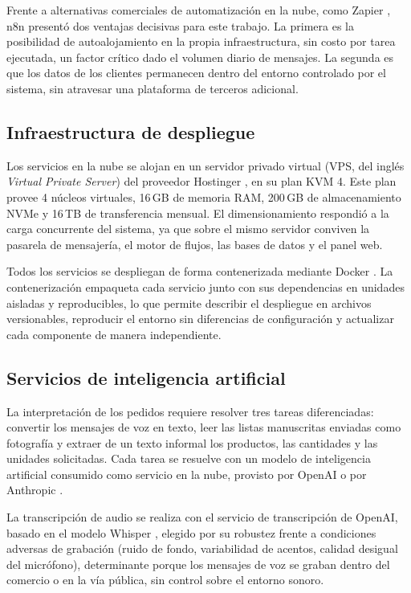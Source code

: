 Frente a alternativas comerciales de automatización en la nube, como Zapier \cite{zapier}, n8n presentó dos ventajas decisivas para este trabajo. La primera es la posibilidad de autoalojamiento en la propia infraestructura, sin costo por tarea ejecutada, un factor crítico dado el volumen diario de mensajes. La segunda es que los datos de los clientes permanecen dentro del entorno controlado por el sistema, sin atravesar una plataforma de terceros adicional.

\subsection{Infraestructura de despliegue}
\label{subsec:vps_docker}

Los servicios en la nube se alojan en un servidor privado virtual (VPS, del inglés \textit{Virtual Private Server}) del proveedor Hostinger \cite{hostinger}, en su plan KVM 4. Este plan provee 4 núcleos virtuales, 16\,GB de memoria RAM, 200\,GB de almacenamiento NVMe y 16\,TB de transferencia mensual. El dimensionamiento respondió a la carga concurrente del sistema, ya que sobre el mismo servidor conviven la pasarela de mensajería, el motor de flujos, las bases de datos y el panel web.

Todos los servicios se despliegan de forma contenerizada mediante Docker \cite{docker}. La contenerización empaqueta cada servicio junto con sus dependencias en unidades aisladas y reproducibles, lo que permite describir el despliegue en archivos versionables, reproducir el entorno sin diferencias de configuración y actualizar cada componente de manera independiente.

\subsection{Servicios de inteligencia artificial}
\label{subsec:servicios_ia}

La interpretación de los pedidos requiere resolver tres tareas diferenciadas: convertir los mensajes de voz en texto, leer las listas manuscritas enviadas como fotografía y extraer de un texto informal los productos, las cantidades y las unidades solicitadas. Cada tarea se resuelve con un modelo de inteligencia artificial consumido como servicio en la nube, provisto por OpenAI \cite{openai} o por Anthropic \cite{claude}.

La transcripción de audio se realiza con el servicio de transcripción de OpenAI, basado en el modelo Whisper \cite{whisper}, elegido por su robustez frente a condiciones adversas de grabación (ruido de fondo, variabilidad de acentos, calidad desigual del micrófono), determinante porque los mensajes de voz se graban dentro del comercio o en la vía pública, sin control sobre el entorno sonoro.

